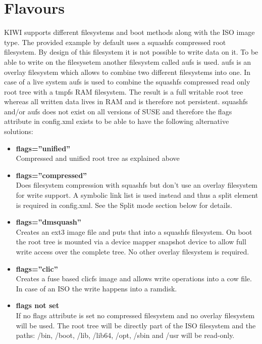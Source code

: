 \section{Flavours}

KIWI supports different filesystems and boot methods along with the
ISO image type. The provided example by default uses a squashfs compressed
root filesystem. By design of this filesystem it is not possible to write
data on it. To be able to write on the filesysetem another filesystem called
aufs is used. aufs is an overlay filesystem which allows to combine two
different filesystems into one. In case of a live system aufs is used
to combine the squashfs compressed read only root tree with a tmpfs
RAM filesystem. The result is a full writable root tree whereas all
written data lives in RAM and is therefore not persistent. squashfs and/or
aufs does not exist on all versions of SUSE and therefore the flags
attribute in config.xml exists to be able to have the following
alternative solutions:

\begin{itemize}
\item \textbf{flags=''unified''}\\
      Compressed and unified root tree as explained above
\item \textbf{flags=''compressed''}\\
      Does filesystem compression with squashfs but don't use an
      overlay filesystem for write support. A symbolic link list is used
      instead and thus a split element is required in config.xml.
      See the Split mode section below for details.
\item \textbf{flags=''dmsquash''}\\
      Creates an ext3 image file and puts that
      into a squashfs filesystem. On boot the root tree is mounted
      via a device mapper snapshot device to allow full write
      access over the complete tree. No other overlay filesystem
      is required.
\item \textbf{flags=''clic''}\\
      Creates a fuse based clicfs image and allows write operations
      into a cow file. In case of an ISO the write happens into a
      ramdisk.
\item \textbf{flags not set}\\
      If no flags attribute is set no compressed filesystem and no overlay
      filesystem will be used. The root tree will be directly part of
      the ISO filesystem and the paths: /bin, /boot, /lib, /lib64, /opt,
      /sbin and /usr will be read-only.
\end{itemize}

